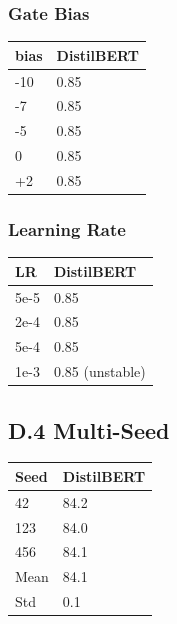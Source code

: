 \subsubsection{Gate Bias}

\begin{table}[H]
\centering
\small
\begin{tabular}{ll}
\toprule
\textbf{bias} & \textbf{DistilBERT} \\
\midrule
-10 & 0.85 \\
-7 & 0.85 \\
-5 & 0.85 \\
0 & 0.85 \\
+2 & 0.85 \\
\bottomrule
\end{tabular}
\end{table}

\subsubsection{Learning Rate}

\begin{table}[H]
\centering
\small
\begin{tabular}{ll}
\toprule
\textbf{LR} & \textbf{DistilBERT} \\
\midrule
5e-5 & 0.85 \\
2e-4 & 0.85 \\
5e-4 & 0.85 \\
1e-3 & 0.85 (unstable) \\
\bottomrule
\end{tabular}
\end{table}

\subsection{D.4 Multi-Seed}

\begin{table}[H]
\centering
\small
\begin{tabular}{ll}
\toprule
\textbf{Seed} & \textbf{DistilBERT} \\
\midrule
42 & 84.2 \\
123 & 84.0 \\
456 & 84.1 \\
Mean & 84.1 \\
Std & 0.1 \\
\bottomrule
\end{tabular}
\end{table}

